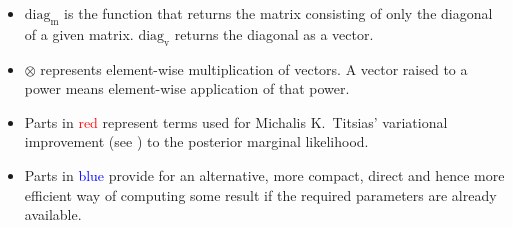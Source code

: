 \documentclass[10pt]{report}
\newcommand{\red}{\textcolor{red}}
\newcommand{\blue}{\textcolor{blue}}
\begin{document}
\begin{itemize}

\item $\mathrm{diag_m}$ is the function that returns the matrix
consisting of only the diagonal of a given matrix.  $\mathrm{diag_v}$
returns the diagonal as a vector.

\item $\otimes$ represents element-wise multiplication of vectors.
A vector raised to a power means element-wise application of that
power.

\item Parts in \red{red} represent terms used for Michalis K.\
Titsias' variational improvement (see \cite{Titsias2009}) to the
posterior marginal likelihood.

\item Parts in \blue{blue} provide for an alternative, more compact,
direct and hence more efficient way of computing some result if the
required parameters are already available.

\end{itemize}
\end{document}
